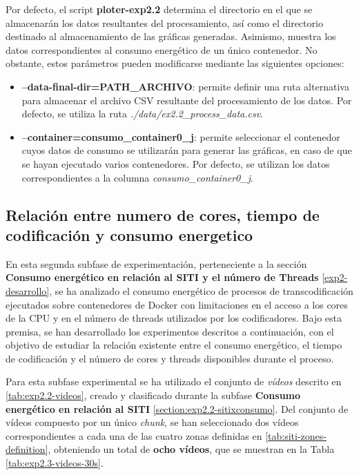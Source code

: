 Por defecto, el script \textbf{ploter-exp2.2} determina el directorio en el que se almacenarán los datos resultantes del procesamiento, así como el directorio destinado al almacenamiento de las gráficas generadas. Asimismo, muestra los datos correspondientes al consumo energético de un único contenedor. No obstante, estos parámetros pueden modificarse mediante las siguientes opciones:

\begin{itemize}
     \item \textbf{--data-final-dir=PATH\_ARCHIVO}: permite definir una ruta alternativa para almacenar el archivo CSV resultante del procesamiento de los datos. Por defecto, se utiliza la ruta \textit{./data/ex2.2\_process\_data.csv}.
     \item \textbf{--container=consumo\_container0\_j}: permite seleccionar el contenedor cuyos datos de consumo se utilizarán para generar las gráficas, en caso de que se hayan ejecutado varios contenedores. Por defecto, se utilizan los datos correspondientes a la columna \textit{consumo\_container0\_j}.
\end{itemize}



\subsection{Relación entre numero de cores, tiempo de codificación y consumo energetico}\label{section:exp2.3-coresxconsumo}
    

En esta segunda subfase de experimentación, perteneciente a la sección \textbf{Consumo energético en relación al SITI y el número de Threads} \ref{exp2-desarrollo}, se ha analizado el consumo energético de procesos de transcodificación ejecutados sobre contenedores de Docker con limitaciones en el acceso a los cores de la CPU y en el número de threads utilizados por los codificadores. Bajo esta premisa, se han desarrollado los experimentos descritos a continuación, con el objetivo de estudiar la relación existente entre el consumo energético, el tiempo de codificación y el número de cores y threads disponibles durante el proceso.

Para esta subfase experimental se ha utilizado el conjunto de \textit{vídeos} descrito en \ref{tab:exp2.2-videos}, creado y clasificado durante la subfase \textbf{Consumo energético en relación al SITI} \ref{section:exp2.2-sitixconsumo}. Del conjunto de vídeos compuesto por un único \textit{chunk}, se han seleccionado dos vídeos correspondientes a cada una de las cuatro zonas definidas en \ref{tab:siti-zones-definition}, obteniendo un total de \textbf{ocho vídeos}, que se muestran en la Tabla \ref{tab:exp2.3-videos-30s}.

